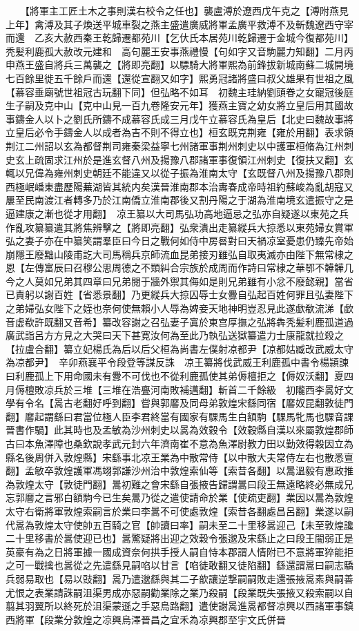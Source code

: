 　　【將軍主工匠土木之事則漢右校令之任也】襲盧溥於遼西戊午克之【溥附燕見上年】禽溥及其子煥送平城車裂之燕主盛遣廣威將軍孟廣平救溥不及斬魏遼西守宰而還　乙亥大赦西秦王乾歸遷都苑川【乞㐲氏本居苑川乾歸遷于金城今復都苑川】　秃髪利鹿孤大赦改元建和　高句麗王安事燕禮慢【句如字又音駒麗力知翻】二月丙申燕王盛自將兵三萬襲之【將即亮翻】以驃騎大將軍熙為前鋒拔新城南蘇二城開境七百餘里徙五千餘戶而還【還從宣翻又如字】熙勇冠諸將盛曰叔父雄果有世祖之風【慕容垂廟號世祖冠古玩翻下同】但弘略不如耳　初魏主珪納劉頭眷之女寵冠後庭生子嗣及克中山【克中山見一百九卷隆安元年】獲燕主寶之幼女將立皇后用其國故事鑄金人以卜之劉氏所鑄不成慕容氏成三月戊午立慕容氏為皇后【北史曰魏故事將立皇后必令手鑄金人以成者為吉不則不得立也】桓玄既克荆雍【雍於用翻】表求領荆江二州詔以玄為都督荆司雍秦梁益寧七州諸軍事荆州刺史以中護軍桓脩為江州刺史玄上疏固求江州於是進玄督八州及揚豫八郡諸軍事復領江州刺史【復扶又翻】玄輒以兄偉為雍州刺史朝廷不能違又以從子振為淮南太守【玄既督八州及揚豫八郡則西極岷嶓東盡歷陽蕪湖皆其統内矣漢晉淮南郡本治夀春成帝時祖約蘇峻為亂胡寇又屢至民南渡江者轉多乃於江南僑立淮南郡後又割丹陽之于湖為淮南境玄遣振守之是逼建康之漸也從才用翻】　凉王纂以大司馬弘功高地逼忌之弘亦自疑遂以東苑之兵作亂攻纂纂遣其將焦辨擊之【將即亮翻】弘衆潰出走纂縱兵大掠悉以東苑婦女賞軍弘之妻子亦在中纂笑謂羣臣曰今日之戰何如侍中房晷對曰天禍凉室憂患仍臻先帝始崩隱王廢黜山陵甫訖大司馬稱兵京師流血昆弟接刃雖弘自取夷滅亦由陛下無常棣之恩【左傳富辰曰召穆公思周德之不類糾合宗族於成周而作詩曰常棣之華鄂不韡韡几今之人莫如兄弟其四章曰兄弟閱于牆外禦其侮如是則兄弟雖有小忿不廢懿親】當省已責躬以謝百姓【省悉景翻】乃更縱兵大掠囚辱士女釁自弘起百姓何罪且弘妻陛下之弟婦弘女陛下之姪也奈何使無賴小人辱為婢妾天地神明豈忍見此遂歔欷流涕【歔音虚欷許既翻又音希】纂改容謝之召弘妻子寘於東宫厚撫之弘將犇秃髪利鹿孤道過廣武詣呂方方見之大哭曰天下甚寛汝何為至此乃執弘送獄纂遣力士康龍就拉殺之【拉盧合翻】纂立妃楊氏為后以后父桓為尚書左僕射凉都尹【凉都姑臧改武威太守為凉都尹】　辛卯燕襄平令段登等謀反誅　凉王纂將伐武威王利鹿孤中書令楊頴諫曰利鹿孤上下用命國未有釁不可伐也不從利鹿孤使其弟傉檀拒之【傉奴沃翻】夏四月傉檀敗凉兵於三堆【三堆在浩亹河南敗補邁翻】斬首二千餘級　初隴西李暠好文學有令名【暠古老翻好呼到翻】嘗與郭黁及同母弟敦煌宋繇同宿【黁奴昆翻敦徒門翻】黁起謂繇曰君當位極人臣李君終當有國家有騍馬生白額駒【騍馬牝馬也騍音課晉書作騧】此其時也及孟敏為沙州刺史以暠為效穀令【效穀縣自漢以來屬敦煌郡師古曰本魚澤障也桑欽說孝武元封六年濟南崔不意為魚澤尉教力田以勤效得穀因立為縣名後周併入敦煌縣】宋繇事北凉王業為中散常侍【以中散大夫常侍左右也散悉亶翻】孟敏卒敦煌護軍馮翊郭謙沙州治中敦煌索仙等【索昔各翻】以暠溫毅有惠政推為敦煌太守【敦徒門翻】暠初難之會宋繇自張掖告歸謂暠曰段王無遠略終必無成兄忘郭黁之言邪白額駒今已生矣暠乃從之遣使請命於業【使疏吏翻】業因以暠為敦煌太守右衛將軍敦煌索嗣言於業曰李暠不可使處敦煌【索昔各翻處昌呂翻】業遂以嗣代暠為敦煌太守使帥五百騎之官【帥讀曰率】嗣未至二十里移暠迎己【未至敦煌讒二十里移書於暠使迎已也】暠驚疑將出迎之效穀令張邈及宋繇止之曰段王闇弱正是英豪有為之日將軍據一國成資奈何拱手授人嗣自恃本郡謂人情附已不意將軍猝能拒之可一戰擒也暠從之先遣繇見嗣啗以甘言【啗徒敢翻又徒陷翻】繇還謂暠曰嗣志驕兵弱易取也【易以豉翻】暠乃遣邈繇與其二子歆讓逆撃嗣嗣敗走還張掖暠素與嗣善尤恨之表業請誅嗣沮渠男成亦惡嗣勸業除之業乃殺嗣【段業既失張掖又殺索嗣以自翦其羽翼所以終死於沮渠蒙遜之手惡烏路翻】遣使謝暠進暠都督凉興以西諸軍事鎮西將軍【段業分敦煌之凉興烏澤晉昌之宜禾為凉興郡至宇文氏併晉